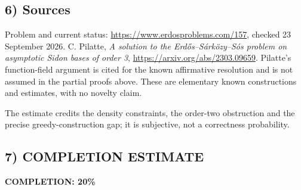 \subsection*{6) Sources}
Problem and current status: \url{https://www.erdosproblems.com/157}, checked 23 September 2026. C. Pilatte, \emph{A solution to the Erd\H{o}s--S\'ark\"ozy--S\'os problem on asymptotic Sidon bases of order 3}, \url{https://arxiv.org/abs/2303.09659}. Pilatte's function-field argument is cited for the known affirmative resolution and is not assumed in the partial proofs above. These are elementary known constructions and estimates, with no novelty claim.

The estimate credits the density constraints, the order-two obstruction and the precise greedy-construction gap; it is subjective, not a correctness probability.
\subsection*{7) COMPLETION ESTIMATE}
\textbf{COMPLETION: 20\%}
